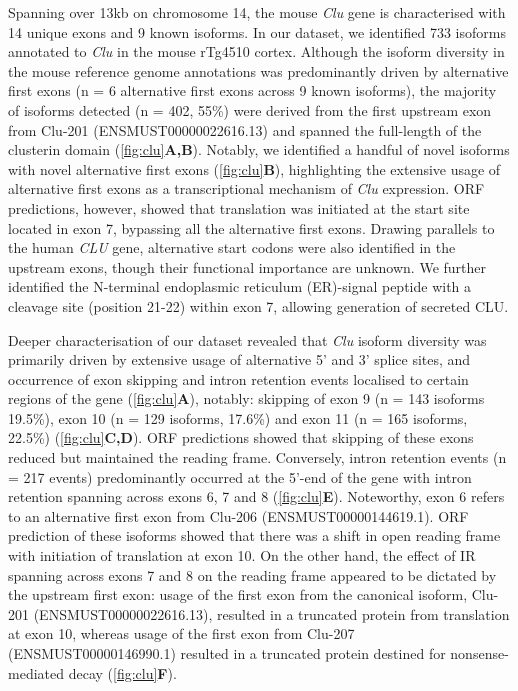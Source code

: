 Spanning over 13kb on chromosome 14, the mouse \textit{Clu} gene is characterised with 14 unique exons and 9 known isoforms. In our dataset, we identified 733 isoforms annotated to \textit{Clu} in the mouse rTg4510 cortex. Although the isoform diversity in the mouse reference genome annotations was predominantly driven by alternative first exons (n = 6 alternative first exons across 9 known isoforms), the majority of isoforms detected (n = 402, 55\%) were derived from the first upstream exon from Clu-201 (ENSMUST00000022616.13) and spanned the full-length of the clusterin domain (\cref{fig:clu}\textbf{A,B}). Notably, we identified a handful of novel isoforms with novel alternative first exons (\cref{fig:clu}\textbf{B}), highlighting the extensive usage of alternative first exons as a transcriptional mechanism of \textit{Clu} expression. ORF predictions, however, showed that translation was initiated at the start site located in exon 7, bypassing all the alternative first exons. Drawing parallels to the human \textit{CLU} gene\cite{Foster2019}, alternative start codons were also identified in the upstream exons, though their functional importance are unknown. We further identified the N-terminal endoplasmic reticulum (ER)-signal peptide with a cleavage site (position 21-22) within exon 7, allowing generation of secreted CLU\cite{Foster2019}.   

Deeper characterisation of our dataset revealed that \textit{Clu} isoform diversity was primarily driven by extensive usage of alternative 5' and 3' splice sites, and occurrence of exon skipping and intron retention events localised to certain regions of the gene (\cref{fig:clu}\textbf{A}), notably: skipping of exon 9 (n = 143 isoforms  19.5\%), exon 10 (n = 129 isoforms, 17.6\%) and exon 11 (n = 165 isoforms, 22.5\%) (\cref{fig:clu}\textbf{C,D}). ORF predictions showed that skipping of these exons reduced but maintained the reading frame. Conversely, intron retention events (n = 217 events) predominantly occurred at the 5'-end of the gene with intron retention spanning across exons 6, 7 and 8 (\cref{fig:clu}\textbf{E}). Noteworthy, exon 6 refers to an alternative first exon from Clu-206 (ENSMUST00000144619.1). ORF prediction of these isoforms showed that there was a shift in open reading frame with initiation of translation at exon 10. On the other hand, the effect of IR spanning across exons 7 and 8 on the reading frame appeared to be dictated by the upstream first exon: usage of the first exon from the canonical isoform, Clu-201 (ENSMUST00000022616.13), resulted in a truncated protein from translation at exon 10, whereas usage of the first exon from Clu-207 (ENSMUST00000146990.1) resulted in a truncated protein destined for nonsense-mediated decay (\cref{fig:clu}\textbf{F}). 



